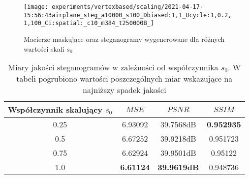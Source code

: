 {{{\begin{figure}
{                    \label{fig:exp-vertex-scale0.75-steg}
                    \texttt{[image: experiments/vertexbased/scaling/2021-04-17-15:56:43airplane\_steg\_a10000\_s100\_Dbiased:1,1\_Ucycle:1,0.2,1,100\_Ci:spatial:\_c10\_m384\_t250000B\_]}
                } \\
                \hspace{8pt}

                \caption[Porównania wizualizacji konwersji oraz macierzy maskujących.]
                {Macierze maskujące oraz steganogramy wygenerowane dla różnych wartości skali $s_0$}
                \label{fig:exp-vertex-scale}
            \end{figure}

            \begin{table}
                \centering
                \caption{Miary jakości steganogramów w zależności od współczynnika $s_0$. W tabeli pogrubiono wartości poszczególnych miar wskazujące na najniższy spadek jakości}
                \begin{tabular}{ |c|c c c| }
                    \hline
                    Współczynnik skalujący \newline $s_0$ & $MSE$ & $PSNR$ & $SSIM$ \\
                    \hline
                    0.25 & 6.93092 & 39.7568dB & \textbf{0.952935} \\
                    0.5 & 6.67252 & 39.9218dB & 0.951723 \\
                    0.75 & 6.62924 & 39.9501dB & 0.95122 \\
                    1.0 & \textbf{6.61124} & \textbf{39.9619dB} & 0.948736 \\
                    \hline
                \end{tabular}
                \label{tab:exp-vertex-scale-errors}
            \end{table}

}}}
